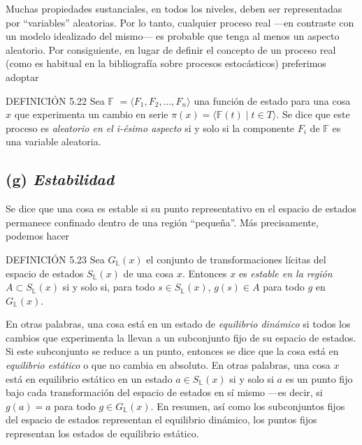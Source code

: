 \begin{justifying}
    Muchas propiedades sustanciales, en todos los niveles, deben ser representadas 
    por ``variables'' aleatorias. Por lo tanto, cualquier proceso real ---en 
    contraste con un modelo idealizado del mismo--- es probable que tenga al menos 
    un aspecto aleatorio. Por consiguiente, en lugar de definir el concepto de 
    un proceso real (como es habitual en la bibliografía sobre procesos 
    estocásticos) preferimos adoptar


    \noindent DEFINICIÓN 5.22 Sea $\mathbb{F}$ $ = \langle F_1, F_2, \dots, F_n \rangle$ 
    una función de estado para una cosa $x$ que experimenta un cambio en serie 
    $\pi(x) = \langle \mathbb F(t) \mid t \in T \rangle$. Se dice que este proceso es 
    \textit{aleatorio en el i-ésimo aspecto} si y solo si la componente $F_i$ 
    de $\mathbb{F}$ es una variable aleatoria.

    \subsection*{(g)\textit{ Estabilidad}}
    \noindent Se dice que una cosa es estable si su punto representativo en el espacio de 
    estados permanece confinado dentro de una región ``pequeña''. Más 
    precisamente, podemos hacer

    \bigskip

    \noindent DEFINICIÓN 5.23 Sea $G_{\mathbb{L}}(x)$ el conjunto de transformaciones 
    lícitas del espacio de estados $S_{\mathbb{L}}(x)$ de una cosa $x$. Entonces $x$ es 
    \textit{estable en la región} $A \subset S_{\mathbb{L}}(x)$ si y solo si, para todo 
    $s \in S_{\mathbb{L}}(x)$, $g(s) \in A$ para todo $g$ en $G_{\mathbb{L}}(x)$.

    En otras palabras, una cosa está en un estado de \textit{equilibrio dinámico} 
    si todos los cambios que experimenta la llevan a un subconjunto fijo de su 
    espacio de estados. Si este subconjunto se reduce a un punto, entonces se 
    dice que la cosa está en \textit{equilibrio estático} o que no cambia en 
    absoluto. En otras palabras, una cosa $x$ está en equilibrio estático en un 
    estado $a \in S_{\mathbb{L}}(x)$ si y solo si $a$ es un punto fijo bajo cada 
    transformación del espacio de estados en sí mismo ---es decir, si $g(a) = a$ 
    para todo $g \in G_{\mathbb{L}}(x)$. En resumen, así como los subconjuntos fijos 
    del espacio de estados representan el equilibrio dinámico, los puntos fijos 
    representan los estados de equilibrio estático.


\end{justifying}
